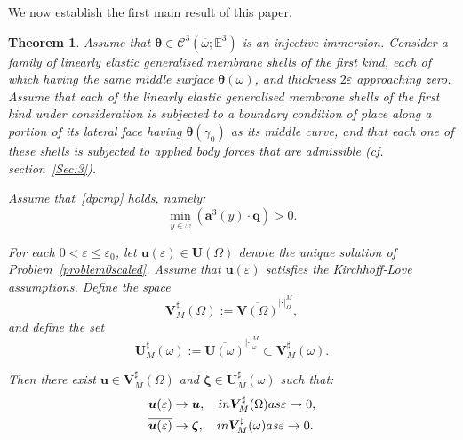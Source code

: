 \documentclass{amsart}
\newtheorem{theorem}{Theorem}[section]
\begin{document}
We now establish the first main result of this paper.

\begin{theorem}
\label{asymptotics}
Assume that $\bm{\theta} \in \mathcal{C}^3(\overline{\omega};\mathbb{E}^3)$ is an injective immersion. Consider a family of linearly elastic generalised membrane shells of the first kind, each of which having the same middle surface $\bm{\theta}(\overline{\omega})$, and thickness $2\varepsilon$ approaching zero. Assume that each of the linearly elastic generalised membrane shells of the first kind under consideration is subjected to a boundary condition of place along a portion of its lateral face having $\bm{\theta}(\gamma_0)$ as its middle curve, and that each one of these shells is subjected to applied body forces that are admissible (cf. section~\ref{Sec:3}).

Assume that~\eqref{dpcmp} holds, namely:
\begin{equation*}
	\min_{y \in \overline{\omega}} (\bm{a}^3(y)\cdot\bm{q}) >0.
\end{equation*}

For each $0<\varepsilon\le \varepsilon_0$, let $\bm{u}(\varepsilon) \in \bm{U}(\Omega)$ denote the unique solution of Problem~\ref{problem0scaled}.
Assume that $\bm{u}(\varepsilon)$ satisfies the Kirchhoff-Love assumptions.
Define the space
\begin{equation*}
\bm{V}_M^\sharp(\Omega):=\overline{\bm{V}(\Omega)}^{|\cdot|_\Omega^M},
\end{equation*}
and define the set
\begin{equation*}
	\bm{U}_M^\sharp(\omega):=\overline{\bm{U}(\omega)}^{|\cdot|_\omega^M} \subset \bm{V}_M^\sharp(\omega).
\end{equation*}

Then there exist $\bm{u} \in \bm{V}_M^\sharp(\Omega)$ and $\bm{\zeta} \in \bm{U}_M^\sharp(\omega)$ such that:
\begin{equation*}
	\begin{aligned}
		\bm{u}(\varepsilon) &\to \bm{u},\quad\textup{ in }\bm{V}_M^\sharp(\Omega) \textup{ as } \varepsilon\to 0,\\
		\overline{\bm{u}(\varepsilon)} &\to \bm{\zeta},\quad\textup{ in }\bm{V}_M^\sharp(\omega) \textup{ as }\varepsilon\to0.
	\end{aligned}
\end{equation*}


\end{theorem}
\end{document}

